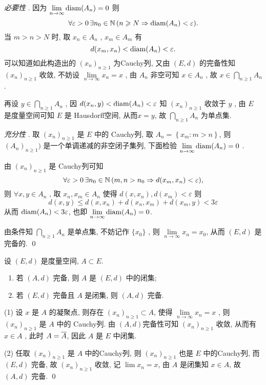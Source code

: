      \begin{Proof}
          \textsl{必要性} . 因为 $ \lim\limits_{n\to\infty}\diam(A_{n})=0 $ 则
          \[
               \forall \varepsilon>0\,\exists n_{0}\in\N\,(n\geqslant N\Rightarrow \diam(A_{n})<\varepsilon). 
          \]
          当 $ m>n>N $ 时, 取 $ x_{n}\in A_{n} $ , $ x_{m}\in A_{m} $ 有
          \[
               d(x_{m}, x_{n})<\diam(A_{n})<\varepsilon. 
          \]
          可以知道如此构造出的 $ (x_{n})_{n\geqslant1} $ 为Cauchy列, 又由 $ (E, d) $ 的完备性知 $ (x_{n})_{n\geqslant1} $ 收敛, 不妨设 $\lim\limits_{n\to\infty}x_{n}=x$ , 由 $ A_{n} $ 非空可知 $ x\in A_{n} $ , 故 $ x\in\bigcap\limits_{n\geqslant1}A_{n} $ . 

          再设 $ y\in\bigcap\limits_{n\geqslant1} A_{n} $ , 因 $ d(x_{n}, y)<\diam(A_{n})<\varepsilon $ 知 $ (x_{n})_{n\geqslant1} $ 收敛于 $ y $ , 由 $ E $ 是度量空间可知 $ E $ 是 Hausdorff空间, 从而$ x=y $, 故 $ \bigcap\limits_{n\geqslant1} A_{n} $ 为单点集. 

          \textsl{充分性} . 取 $ (x_{n})_{n\geqslant1} $ 是 $ E $ 中的 Cauchy列, 取 $ A_{n}=\left\{ x_{m}:m>n \right\} $, 则 $ (A_{n})_{n\geqslant1}) $ 是一个单调递减的非空闭子集列, 下面检验 $ \lim\limits_{n\to\infty}\diam(A_{n})=0 $ . 

          由 $ (x_{n})_{n\geqslant1} $ 是 Cauchy列可知
          \[
               \forall \varepsilon>0\, \exists n_{0}\in\N\,(m, n>n_{0}\Rightarrow d(x_{m}, x_{n})<\varepsilon),
          \]
          则 $ \forall x, y\in A_{n} $ , 取 $ x_{n}, x_{m}\in A_{n} $ 使得 $ d(x, x_{n}), d(x_{m})<\varepsilon $ 则
          \[
               d(x, y)\leqslant d(x, x_{n})+d(x_{n}, x_{m})+d(x_{m}, y) < 3\varepsilon         
          \]
          从而 $ \diam(A_{n})<3\varepsilon $, 也即 $\lim\limits_{n\to\infty} \diam(A_{n})=0 $. 

          由条件知 $ \bigcap\limits_{n\geqslant1}A_{n} $ 是单点集, 不妨记作 $ \{ x_{0} \} $ , 则 $ \lim\limits_{n\to\infty}x_{n}=x_{0} $, 从而 $ (E, d) $  是完备的. \qed
     \end{Proof}
     \begin{Theorem}
          设 $ (E, d) $ 是度量空间, $ A\subset E $. 
          \begin{enumerate}[(1)]
               \item 若 $ (A, d) $ 完备, 则 $ A $ 是 $ (E, d) $ 中的闭集;
               \item 若 $ (E, d) $ 完备且 $ A $ 是闭集, 则 $ (A, d) $ 完备. 
          \end{enumerate} 
     \end{Theorem}
     \begin{Proof}
          (1) 设 $ x $ 是 $ A $ 的凝聚点, 则存在 $ (x_{n})_{n\geqslant1}\subset A $, 使得 $ \lim\limits_{n\to\infty}x_{n}=x $ , 则 $ (x_{n})_{n\geqslant1} $ 是 $ A $ 中的 Cauchy列. 由 $ (A, d) $完备性可知 $ (x_{n})_{n\geqslant1} $ 收敛, 从而有 $ x\in A $ , 此时 $ A=\baro{A} $, 因此 $ A $ 是 $ E $ 中闭集. 

          (2) 任取 $ (x_{n})_{n\geqslant1} $ 是 $ A $ 中的Cauchy列, 则 $ (x_{n})_{n\geqslant1} $ 也是 $ E $ 中的Cauchy列, 而 $ (E, d) $ 完备, 故 $ (x_{n})_{n\geqslant1} $ 收敛, 记 $ \lim\limits x_{n}=x $, 由 $ A $ 是闭集知 $ x\in A $, 故 $ (A, d) $ 完备. \qed
     \end{Proof}
